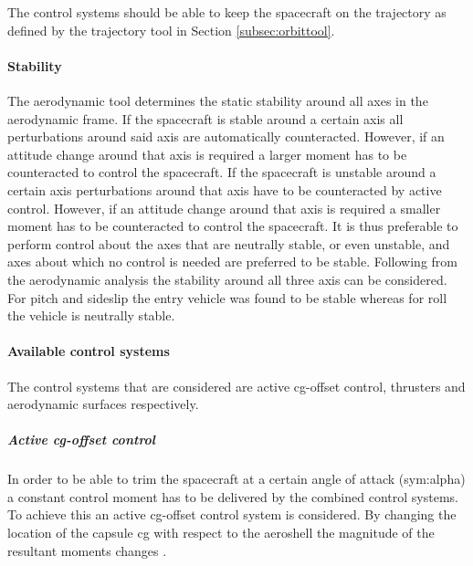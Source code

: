 The control systems should be able to keep the spacecraft on the trajectory as defined by the trajectory tool in Section \ref{subsec:orbittool}.

%

\paragraph{Stability}
\label{control:stab}

The aerodynamic tool determines the static stability around all axes in the aerodynamic frame. If the spacecraft is stable around a certain axis all perturbations around said axis are automatically counteracted. However, if an attitude change around that axis is required a larger moment has to be counteracted to control the spacecraft. 
If the spacecraft is unstable around a certain axis perturbations around that axis have to be counteracted by active control. However, if an attitude change around that axis is required a smaller moment has to be counteracted to control the spacecraft. It is thus preferable to perform control about the axes that are neutrally stable, or even unstable, and axes about which no control is needed are preferred to be stable. Following from the aerodynamic analysis the stability around all three axis can be considered. For pitch and sideslip the entry vehicle was found to be stable whereas for roll the vehicle is neutrally stable. 

\paragraph{Available control systems}
\label{control:system}

The control systems that are considered are active \gls{cg}-offset control, thrusters and aerodynamic surfaces respectively.

\subparagraph{Active \acrlong{cg}-offset control}

In order to be able to trim the spacecraft at a certain angle of attack (\gls{sym:alpha}) a constant control moment has to be delivered by the combined control systems. To achieve this an active \gls{cg}-offset control system is considered. By changing the location of the capsule \gls{cg} with respect to the aeroshell the magnitude of the resultant moments changes \cite{Mulqueen1991}. 

